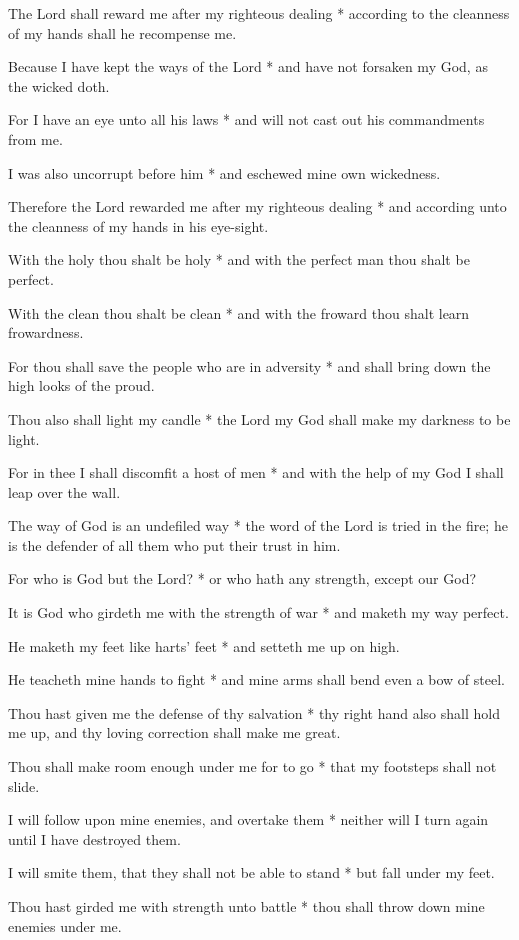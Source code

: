 The Lord shall reward me after my righteous dealing * according to the cleanness of my hands shall he recompense me.

Because I have kept the ways of the Lord * and have not forsaken my God, as the wicked doth.

For I have an eye unto all his laws * and will not cast out his commandments from me.

I was also uncorrupt before him * and eschewed mine own wickedness.

Therefore the Lord rewarded me after my righteous dealing * and according unto the cleanness of my hands in his eye-sight.

With the holy thou shalt be holy * and with the perfect man thou shalt be perfect.

With the clean thou shalt be clean * and with the froward thou shalt learn frowardness.

For thou shall save the people who are in adversity * and shall bring down the high looks of the proud.

Thou also shall light my candle * the Lord my God shall make my darkness to be light.

For in thee I shall discomfit a host of men * and with the help of my God I shall leap over the wall.

The way of God is an undefiled way * the word of the Lord is tried in the fire; he is the defender of all them who put their trust in him.

For who is God but the Lord? * or who hath any strength, except our God?

It is God who girdeth me with the strength of war * and maketh my way perfect.

He maketh my feet like harts' feet * and setteth me up on high.

He teacheth mine hands to fight * and mine arms shall bend even a bow of steel.

Thou hast given me the defense of thy salvation * thy right hand also shall hold me up, and thy loving correction shall make me great.

Thou shall make room enough under me for to go * that my footsteps shall not slide.

I will follow upon mine enemies, and overtake them * neither will I turn again until I have destroyed them.

I will smite them, that they shall not be able to stand * but fall under my feet.

Thou hast girded me with strength unto battle * thou shall throw down mine enemies under me.


